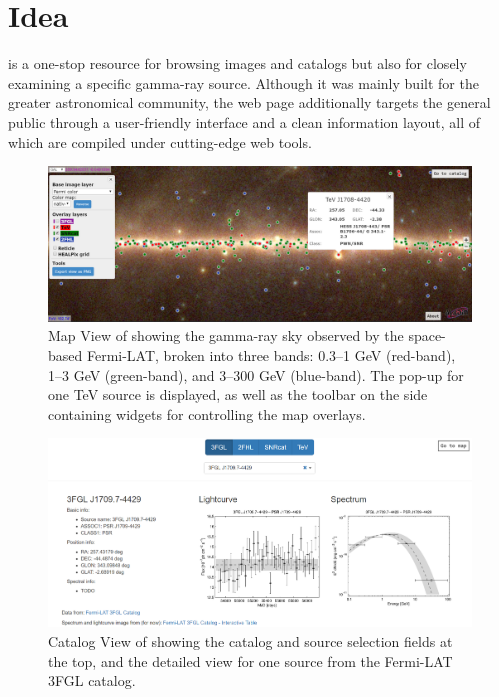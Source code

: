 \section{Idea}

\gammasky is a one-stop resource for browsing images and catalogs but also for closely examining a specific gamma-ray source. Although it was mainly built for the greater astronomical community, the web page additionally targets the general public through a user-friendly interface and a clean information layout, all of which are compiled under cutting-edge web tools.

\begin{figure}[tb]
\centerline{\includegraphics[width=\textwidth]{figures/mapview_retake}}
\caption{Map View of \gammasky showing the gamma-ray sky observed by the space-based Fermi-LAT, broken into three bands: 0.3--1 GeV (red-band), 1--3 GeV (green-band), and 3--300 GeV (blue-band). The pop-up for one TeV source is displayed, as well as the toolbar on the side containing widgets for controlling the map overlays.}
\label{fig:mapview}
\end{figure}

\begin{figure}[tb]
\centerline{\includegraphics[width=\textwidth]{figures/catview_retake}}
\caption{Catalog View of \gammasky showing the catalog and source selection fields at the top, and the detailed view for one source from the Fermi-LAT 3FGL catalog.}
\label{fig:catview}
\end{figure}

